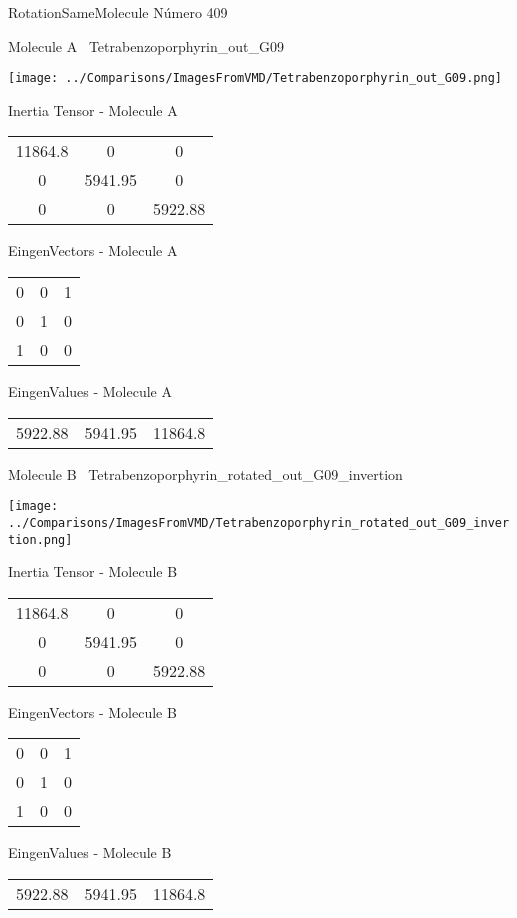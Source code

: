 \vtab[-3cm]
\begin{center}
{\large RotationSameMolecule \tab Número 409}
\end{center}
\begin{multicols}{2}
\begin{center}

Molecule A \
Tetrabenzoporphyrin\_out\_G09

\texttt{[image: ../Comparisons/ImagesFromVMD/Tetrabenzoporphyrin\_out\_G09.png]}

Inertia Tensor - Molecule A \\
\begin{tabular}{|c c c|}
11864.8	 & 	0	 & 	0	 \\
0	 & 	5941.95	 & 	0	 \\
0	 & 	0	 & 	5922.88
\end{tabular}

\vtab
 EingenVectors - Molecule A     \\
\begin{tabular}{|c c c|}
0	 & 	0	 & 	1	 \\
0	 & 	1	 & 	0	 \\
1	 & 	0	 & 	0
\end{tabular}

\vtab
 EingenValues - Molecule A     \\
\begin{tabular}{|c c c|}
5922.88	 & 	5941.95	 & 	11864.8	 \\
\end{tabular}
\columnbreak

Molecule B \
Tetrabenzoporphyrin\_rotated\_out\_G09\_invertion

\texttt{[image: ../Comparisons/ImagesFromVMD/Tetrabenzoporphyrin\_rotated\_out\_G09\_invertion.png]}

Inertia Tensor - Molecule B \\
\begin{tabular}{|c c c|}
11864.8	 & 	0	 & 	0	 \\
0	 & 	5941.95	 & 	0	 \\
0	 & 	0	 & 	5922.88
\end{tabular}

\vtab
 EingenVectors - Molecule B     \\
\begin{tabular}{|c c c|}
0	 & 	0	 & 	1	 \\
0	 & 	1	 & 	0	 \\
1	 & 	0	 & 	0
\end{tabular}

\vtab
 EingenValues - Molecule B     \\
\begin{tabular}{|c c c|}
5922.88	 & 	5941.95	 & 	11864.8	 \\
\end{tabular}

\end{center}
\end{multicols}

